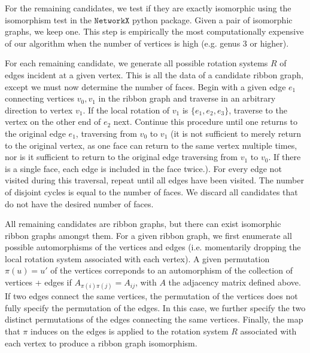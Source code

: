 \documentclass[12pt]{article}
\numberwithin{equation}{section}
\begin{document}
For the remaining candidates, we test if they are exactly isomorphic using the isomorphism test in the $\texttt{NetworkX}$ python package. Given a pair of isomorphic graphs, we keep one. This step is empirically the most computationally expensive of our algorithm when the number of vertices is high (e.g. genus 3 or higher).

For each remaining candidate, we generate all possible rotation systems $R$ of edges incident at a given vertex. This is all the data of a candidate ribbon graph, except we must now determine the number of faces. Begin with a given edge $e_1$ connecting vertices $v_0,v_1$ in the ribbon graph and traverse in an arbitrary direction to vertex $v_1$. If the local rotation of $v_1$ is $\{e_1, e_2,e_3\}$, traverse to the vertex on the other end of $e_2$ next. Continue this procedure until one returns to the original edge $e_1$, traversing from $v_0$ to $v_1$ (it is not sufficient to merely return to the original vertex, as one face can return to the same vertex multiple times, nor is it sufficient to return to the original edge traversing from $v_1$ to $v_0$. If there is a single face, each edge is included in the face twice.). For every edge not visited during this traversal, repeat until all edges have been visited. The number of disjoint cycles is equal to the number of faces. We discard all candidates that do not have the desired number of faces.

All remaining candidates are ribbon graphs, but there can exist isomorphic ribbon graphs amongst them. For a given ribbon graph, we first enumerate all possible automorphisms of the vertices and edges (i.e. momentarily dropping the local rotation system associated with each vertex). A given permutation $\pi(u)=u'$ of the vertices correponds to an automorphism of the collection of vertices + edges if $A_{\pi(i)\pi(j)}=A_{ij}$, with $A$ the adjacency matrix defined above. If two edges connect the same vertices, the permutation of the vertices does not fully specify the permutation of the edges. In this case, we further specify the two distinct permutations of the edges connecting the same vertices. Finally, the map that $\pi$ induces on the edges is applied to the rotation system $R$ associated with each vertex to produce a ribbon graph isomorphism.
\end{document}
